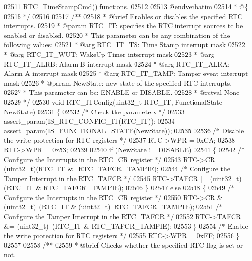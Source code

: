 \begin{DoxyCode}
02511 \textcolor{comment}{     RTC\_TimeStampCmd() functions.}
02512 \textcolor{comment}{}
02513 \textcolor{comment}{@endverbatim}
02514 \textcolor{comment}{  * @\{}
02515 \textcolor{comment}{  */}
02516 
02517 \textcolor{comment}{/**}
02518 \textcolor{comment}{  * @brief  Enables or disables the specified RTC interrupts.}
02519 \textcolor{comment}{  * @param  RTC\_IT: specifies the RTC interrupt sources to be enabled or disabled. }
02520 \textcolor{comment}{  *          This parameter can be any combination of the following values:}
02521 \textcolor{comment}{  *            @arg RTC\_IT\_TS:  Time Stamp interrupt mask}
02522 \textcolor{comment}{  *            @arg RTC\_IT\_WUT:  WakeUp Timer interrupt mask}
02523 \textcolor{comment}{  *            @arg RTC\_IT\_ALRB:  Alarm B interrupt mask}
02524 \textcolor{comment}{  *            @arg RTC\_IT\_ALRA:  Alarm A interrupt mask}
02525 \textcolor{comment}{  *            @arg RTC\_IT\_TAMP: Tamper event interrupt mask}
02526 \textcolor{comment}{  * @param  NewState: new state of the specified RTC interrupts.}
02527 \textcolor{comment}{  *          This parameter can be: ENABLE or DISABLE.}
02528 \textcolor{comment}{  * @retval None}
02529 \textcolor{comment}{  */}
02530 \textcolor{keywordtype}{void} RTC_ITConfig(uint32\_t RTC\_IT, FunctionalState NewState)
02531 \{
02532   \textcolor{comment}{/* Check the parameters */}
02533   assert_param(IS\_RTC\_CONFIG\_IT(RTC\_IT));
02534   assert_param(IS\_FUNCTIONAL\_STATE(NewState));
02535 
02536   \textcolor{comment}{/* Disable the write protection for RTC registers */}
02537   RTC->WPR = 0xCA;
02538   RTC->WPR = 0x53;
02539 
02540   \textcolor{keywordflow}{if} (NewState != DISABLE)
02541   \{
02542     \textcolor{comment}{/* Configure the Interrupts in the RTC\_CR register */}
02543     RTC->CR |= (uint32\_t)(RTC\_IT & ~RTC_TAFCR_TAMPIE);
02544     \textcolor{comment}{/* Configure the Tamper Interrupt in the RTC\_TAFCR */}
02545     RTC->TAFCR |= (uint32\_t)(RTC\_IT & RTC_TAFCR_TAMPIE);
02546   \}
02547   \textcolor{keywordflow}{else}
02548   \{
02549     \textcolor{comment}{/* Configure the Interrupts in the RTC\_CR register */}
02550     RTC->CR &= (uint32\_t)~(RTC\_IT & (uint32\_t)~RTC_TAFCR_TAMPIE);
02551     \textcolor{comment}{/* Configure the Tamper Interrupt in the RTC\_TAFCR */}
02552     RTC->TAFCR &= (uint32\_t)~(RTC\_IT & RTC_TAFCR_TAMPIE);
02553   \}
02554   \textcolor{comment}{/* Enable the write protection for RTC registers */}
02555   RTC->WPR = 0xFF;
02556 \}
02557 
02558 \textcolor{comment}{/**}
02559 \textcolor{comment}{  * @brief  Checks whether the specified RTC flag is set or not.}

\end{DoxyCode}
